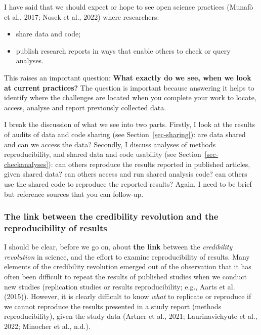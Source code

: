 \documentclass[
  letterpaper,
  DIV=11,
  numbers=noendperiod]{scrreprt}
\providecommand{\tightlist}{%
  \setlength{\itemsep}{0pt}\setlength{\parskip}{0pt}}\usepackage{longtable,booktabs,array}
\begin{document}
I have said that we should expect or hope to see open science practices
(Munafò et al., 2017; Nosek et al., 2022) where researchers:

\begin{itemize}
\tightlist
\item
  share data and code;
\item
  publish research reports in ways that enable others to check or query
  analyses.
\end{itemize}

This raises an important question: \textbf{What exactly do we see, when
we look at current practices?} The question is important because
answering it helps to identify where the challenges are located when you
complete your work to locate, access, analyse and report previously
collected data.

I break the discussion of what we see into two parts. Firstly, I look at
the results of audits of data and code sharing (see
Section~\ref{sec-sharing}): are data shared and can we access the data?
Secondly, I discuss analyses of methods reproducibility, and shared data
and code usability (see Section~\ref{sec-checkanalyses}): can others
reproduce the results reported in published articles, given shared data?
can others access and run shared analysis code? can others use the
shared code to reproduce the reported results? Again, I need to be brief
but reference sources that you can follow-up.

\hypertarget{the-link-between-the-credibility-revolution-and-the-reproducibility-of-results}{%
\subsubsection{The link between the credibility revolution and the
reproducibility of
results}\label{the-link-between-the-credibility-revolution-and-the-reproducibility-of-results}}

I should be clear, before we go on, about \textbf{the link} between the
\emph{credibility revolution} in science, and the effort to examine
reproducibility of results. Many elements of the credibility revolution
emerged out of the observation that it has often been difficult to
repeat the results of published studies when we conduct new studies
(replication studies or results reproducibility; e.g., Aarts et al.
(2015)). However, it is clearly difficult to know \emph{what} to
replicate or reproduce if we cannot reproduce the results presented in a
study report (methods reproducibility), given the study data (Artner et
al., 2021; Laurinavichyute et al., 2022; Minocher et al., n.d.).
\end{document}
